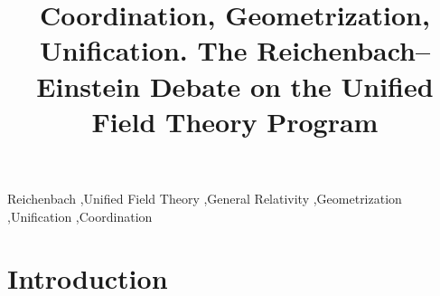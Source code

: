\documentclass[draft]{article}
\title{Coordination, Geometrization, Unification. The Reichenbach--Einstein Debate on the Unified Field Theory Program}
\begin{document}
\maketitle

\begin{abstract}
\lipsum*[1-2]
\end{abstract}


\begin{keywords}
Reichenbach \sep Unified Field Theory \sep General Relativity \sep Geometrization \sep Unification \sep Coordination	
\end{keywords}

\section*{Introduction}

\lipsum[1]
\end{document}
